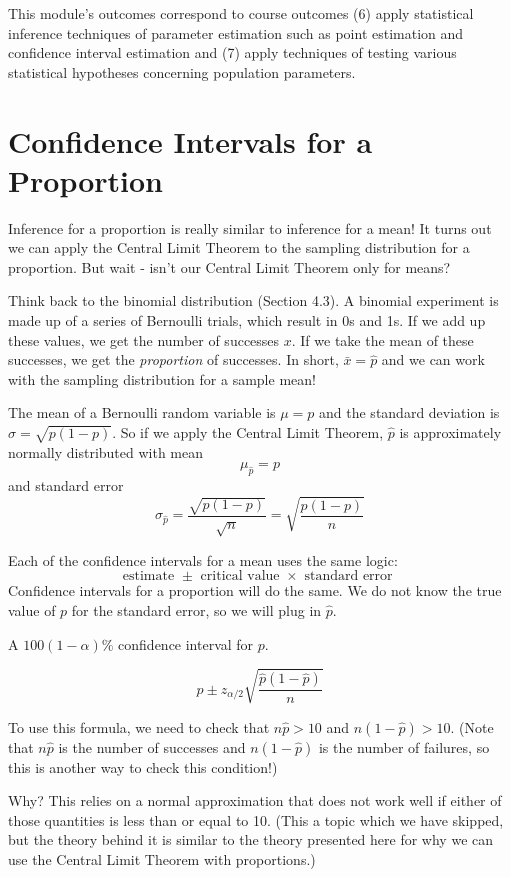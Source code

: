 \documentclass[
]{book}
\begin{document}
This module's outcomes correspond to course outcomes (6) apply statistical inference techniques of parameter estimation such as point estimation and confidence interval estimation and (7) apply techniques of testing various statistical hypotheses concerning population parameters.

\section{Confidence Intervals for a Proportion}\label{confidence-intervals-for-a-proportion}

Inference for a proportion is really similar to inference for a mean! It turns out we can apply the Central Limit Theorem to the sampling distribution for a proportion. But wait - isn't our Central Limit Theorem only for means?

Think back to the binomial distribution (Section 4.3). A binomial experiment is made up of a series of Bernoulli trials, which result in 0s and 1s. If we add up these values, we get the number of successes \(x\). If we take the mean of these successes, we get the \emph{proportion} of successes. In short, \(\bar{x} = \hat{p}\) and we can work with the sampling distribution for a sample mean!

The mean of a Bernoulli random variable is \(\mu = p\) and the standard deviation is \(\sigma = \sqrt{p(1-p)}\). So if we apply the Central Limit Theorem, \(\hat{p}\) is approximately normally distributed with mean \[\mu_{\hat{p}} = p\] and standard error \[\sigma_{\hat{p}} = \frac{\sqrt{p(1-p)}}{\sqrt{n}} = \sqrt{\frac{p(1-p)}{n}}\]

Each of the confidence intervals for a mean uses the same logic: \[\text{estimate }\pm\text{ critical value }\times\text{ standard error }\] Confidence intervals for a proportion will do the same. We do not know the true value of \(p\) for the standard error, so we will plug in \(\hat{p}\).

A \(100(1-\alpha)\%\) confidence interval for \(p\).

\[\hat{p}\pm z_{\alpha/2}\sqrt{\frac{\hat{p}(1-\hat{p})}{n}}\]

To use this formula, we need to check that \(n\hat{p} > 10\) and \(n(1-\hat{p})>10\). (Note that \(n\hat{p}\) is the number of successes and \(n(1-\hat{p})\) is the number of failures, so this is another way to check this condition!)

Why? This relies on a normal approximation that does not work well if either of those quantities is less than or equal to 10. (This a topic which we have skipped, but the theory behind it is similar to the theory presented here for why we can use the Central Limit Theorem with proportions.)
\end{document}
